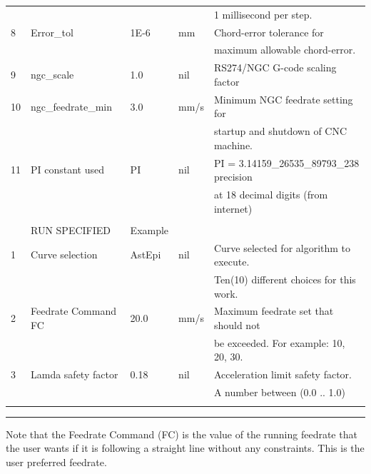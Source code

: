 \begin{table}[ht]
{\begin{tabular}{ p{0.5cm} p{4.0cm} p{1.25cm} p{1.25cm} p{7.50cm} }
			&                     &        &       & 1 millisecond per step. \\
			8	& Error\_tol          & 1E-6   & mm    & Chord-error tolerance for  \\
			&                     &        &       & maximum allowable chord-error. \\
			9   & ngc\_scale          & 1.0    & nil   & RS274/NGC G-code scaling factor \\
			10	& ngc\_feedrate\_min  & 3.0    & mm/s  & Minimum NGC feedrate setting for\\
			&                     &        &       & startup and shutdown of CNC machine.\\
			11	& PI constant used    & PI     & nil   & PI = 3.14159\_26535\_89793\_238 precision\\
			&                     &        &       & at 18 decimal digits (from internet)\\
			&                     &        &       &     \\
			& RUN SPECIFIED       &Example &       &     \\
			1   & Curve selection     & AstEpi & nil   & Curve selected for algorithm to execute. \\
			&                     &        &       & Ten(10) different choices for this work. \\
			2   & Feedrate Command FC &  20.0  & mm/s  & Maximum feedrate set that should not \\
			&                     &        &       & be exceeded. For example: 10, 20, 30. \\
			3   & Lamda safety factor &  0.18  & nil   & Acceleration limit safety factor. \\
			&                     &        &       & A number between (0.0 .. 1.0) \\
			&                     &        &       &     
		\end{tabular}
		
		
	}   %
	\hrule
\end{table}

Note that the Feedrate Command (FC) is the value of the running feedrate that the user wants if it is following a straight line without any constraints. This is the user preferred feedrate. \\

